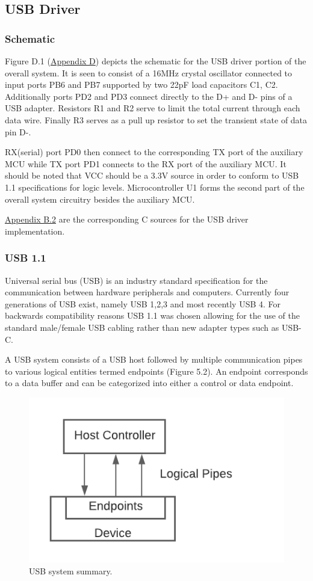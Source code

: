 \subsection{USB Driver}

\subsubsection{Schematic}
Figure D.1 (\hyperref[sec:appd1]{Appendix D}) depicts the schematic for the USB driver portion of the overall system. It is seen to consist of a 16MHz crystal oscillator connected to input ports PB6 and PB7 supported by two 22pF load capacitors C1, C2. Additionally ports PD2 and PD3 connect directly to the D+ and D- pins of a USB adapter. Resistors R1 and R2 serve to limit the total current through each data wire. Finally R3 serves as a pull up resistor to set the transient state of data pin D-.

RX(serial) port PD0 then connect to the corresponding TX port of the auxiliary MCU while TX port PD1 connects to the RX port of the auxiliary MCU. It should be noted that VCC should be a 3.3V source in order to conform to USB 1.1 specifications for logic levels. Microcontroller U1 forms the second part of the overall system circuitry besides the auxiliary MCU.

\hyperref[sec:usbmcu]{Appendix B.2} are the corresponding C sources for the USB driver implementation.

\subsubsection{USB 1.1}
Universal serial bus (USB) is an industry standard specification for the communication between hardware peripherals and computers. Currently four generations of USB exist, namely USB 1,2,3 and most recently USB 4. For backwards compatibility reasons USB 1.1 was chosen allowing for the use of the standard male/female USB cabling rather than new adapter types such as USB-C.

A USB system consists of a USB host followed by multiple communication pipes to various logical entities termed endpoints (Figure 5.2). An endpoint corresponds to a data buffer and can be categorized into either a control or data endpoint.

\begin{figure}[H]
\centering
\includegraphics[width=0.4\columnwidth]{Figures/Fig_68.png}
\caption{USB system summary.}
\label{fig:gantt}
\end{figure}

